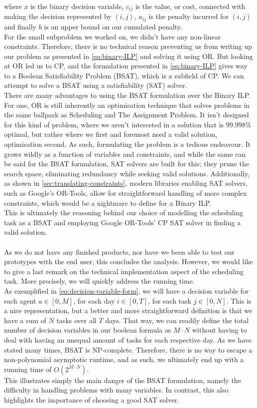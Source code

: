 where \(x\) is the binary decision variable, \(c_{ij}\) is the value, or cost, connected with making the decision represented by \( (i,j) \), \( a_{ij} \) is the penalty incurred for \( (i,j) \) and finally \(b\) is an upper bound on our cumulated penalty.
\\
For the small subproblem we worked on, we didn't have any non-linear constraints. Therefore, there is no technical reason preventing us from writing up our problem as presented in \autoref{eq:binary-ILP} and solving it using OR. But looking at OR led us to CP, and the formulation presented in \autoref{eq:binary-ILP} gives way to a Boolean Satisfiability Problem (BSAT), which is a subfield of CP. We can attempt to solve a BSAT using a satisfiability (SAT) solver.
\\
There are many advantages to using the BSAT formulation over the Binary ILP. For one, OR is still inherently an optimisation technique that solves problems in the same ballpark as Scheduling and The Assignment Problem. It isn't designed for this kind of problem, where we aren't interested in a solution that is \(99.998\%\) optimal, but rather where we first and foremost need a valid solution, optimisation second. As such, formulating the problem is a tedious endeavour. It grows wildly as a function of variables and constraints, and while the same can be said for the BSAT formulation, SAT solvers are built for this; they prune the search space, eliminating redundancy while seeking valid solutions. Additionally, as shown in \autoref{sec:translating-constraints}, modern libraries enabling SAT solvers, such as Google's OR-Tools, allow for straightforward handling of more complex constraints, which would be a nightmare to define for a Binary ILP.
\\
This is ultimately the reasoning behind our choice of modelling the scheduling task as a BSAT and employing Google OR-Tools' CP SAT solver in finding a valid solution.
\\
\\
As we do not have any finished products, nor have we been able to test our prototypes with the end user, this concludes the analysis. However, we would like to give a last remark on the technical implementation aspect of the scheduling task. More precisely, we will quickly address the running time.
\\
As exemplified in \autoref{eq:decision-variable-form}, we will have a decision variable for each agent \(a \in [0, M]\), for each day \(i \in [0, T]\), for each task \(j \in [0, N]\). This is a nice representation, but a better and more straightforward definition is that we have a sum of \(N\) tasks over all \(T\) days. That way, we can readily define the total number of decision variables in our boolean formula as \(M \cdot N\) without having to deal with having an unequal amount of tasks for each respective day. As we have stated many times, BSAT is NP-complete. Therefore, there is no way to escape a non-polynomial asymptotic runtime, and as such, we ultimately end up with a running time of \(O(2^{M \cdot N})\).
\\
This illustrates simply the main danger of the BSAT formulation, namely the difficulty in handling problems with many variables. In contrast, this also highlights the importance of choosing a good SAT solver.
